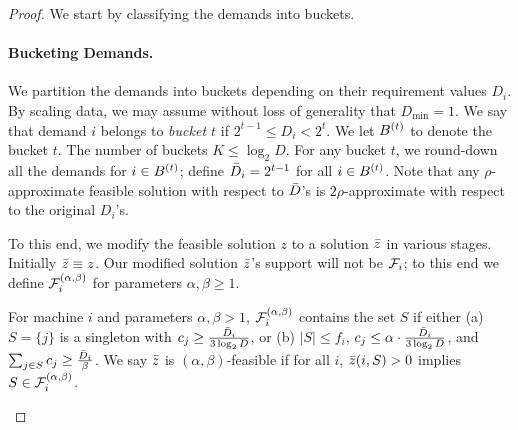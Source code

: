 	    \begin{proof}
	    We start by classifying the demands into buckets.
	
	    	\paragraph{Bucketing Demands.} We partition the demands into buckets depending on their requirement values $D_i$. By scaling data, we may assume without loss of generality that $D_\mathrm{min} = 1$.
	    	We say that demand $i$ belongs to \emph{bucket $t$} if $2^{t-1} \leq D_i < 2^t$. We let $B^{(t)}$ to denote the bucket $t$. The number of buckets $K \leq \log_2 D$.
	    	For any bucket $t$, we round-down all the demands for $i\in B^{(t)}$; define $\bar{D}_i = 2^{t-1}$ for all $i\in B^{(t)}$. Note that any $\rho$-approximate feasible solution with respect to $\bar{D}$'s is $2\rho$-approximate with respect to the original $D_i$'s. \smallskip
	
	
	
	
\noindent
  To this end, we modify the feasible solution $z$ to a solution $\bar z$  in various stages. Initially $\bar z \equiv z$.
	    Our modified solution $\bar z$'s support will not be ${\cal F}_i$; to this end we define ${\cal F}^{(\alpha,\beta)}_i$ for parameters $\alpha,\beta \geq 1$.
	    \begin{definition}
For machine $i$ and parameters $\alpha,\beta > 1$, ${\cal F}^{(\alpha,\beta)}_i$ contains the set $S$ if either (a) $S = \{j\}$ is a singleton with $c_j \geq \frac{\bar{D}_i}{3\log_2 D}$,
or (b) $|S|\leq f_i$, $c_j \leq \alpha \cdot \frac{\bar{D}_i}{3\log_2 D}$, and $\sum_{j\in S} c_j \geq \frac{\bar{D}_i}{\beta}$. 	    We say $\bar z$ is $(\alpha,\beta)$-feasible if for all $i$, $\bar z(i,S) > 0$ implies $S\in {\cal F}^{(\alpha,\beta)}_i$.
	    \end{definition}
	    \noindent

	    \medskip
	
		

\end{proof}
